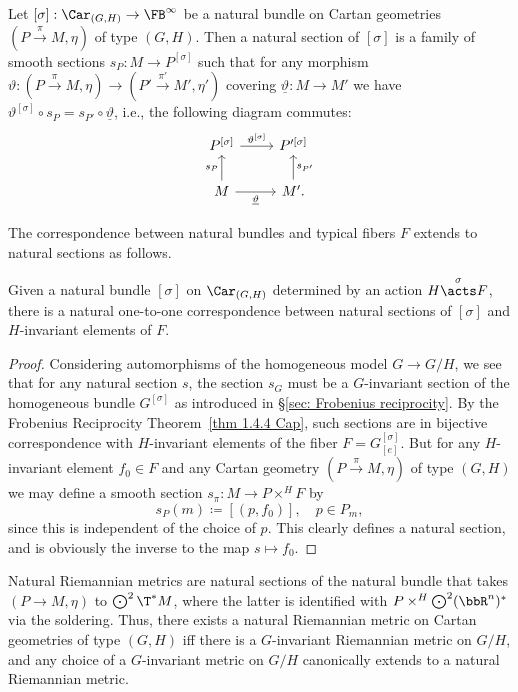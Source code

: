 \begin{defn}
    Let $[\sigma]:\Car_{(G,H)}\to \FB^\infty$ be a natural bundle on Cartan geometries $(P\overset{\pi}{\to}M,\eta)$ of type $(G,H)$. Then a natural section of $[\sigma]$ is a family of smooth sections $s_{P}:M\to P^{[\sigma]}$ such that for any morphism $\vartheta:(P\overset{\pi}{\to} M,\eta)\to (P'\overset{\pi'}{\to} M',\eta')$ covering $\underline{\vartheta}:M\to M'$ we have $\vartheta^{[\sigma]}\circ s_P=s_{P'}\circ \underline{\vartheta}$, i.e., the following diagram commutes:
    \[
    \begin{tikzcd}
        P^{[\sigma]}\arrow[r,"\vartheta^{[\sigma]}"] & P^{\prime[\sigma]}\\
        M\arrow[u,"s_P"]\arrow[r,swap,"\underline{\vartheta}"]& M'.\arrow[u,swap,"s_{P'}"]
    \end{tikzcd}
    \]
\end{defn}

The correspondence between natural bundles and typical fibers $F$ extends to natural sections as follows.

\begin{prop}\label{prop natural sections}
    Given a natural bundle $[\sigma]$ on $\Car_{(G,H)}$ determined by an action $H\overset{\sigma}{\acts}F$, there is a natural one-to-one correspondence between natural sections of $[\sigma]$ and $H$-invariant elements of $F$.
\end{prop}
\begin{proof}
    Considering automorphisms of the homogeneous model $G\to G\slash H$, we see that for any natural section $s$, the section $s_G$ must be a $G$-invariant section of the homogeneous bundle $G^{[\sigma]}$ as introduced in \S\ref{sec: Frobenius reciprocity}. By the Frobenius Reciprocity Theorem~\ref{thm 1.4.4 Cap}, such sections are in bijective correspondence with $H$-invariant elements of the fiber $F=G^{[\sigma]}_{[e]}$.
    But for any $H$-invariant element $f_0\in F$ and any Cartan geometry $(P\overset{\pi}{\to}M,\eta)$ of type $(G,H)$ we may define a smooth section $s_\pi:M\to P\times^H F$ by 
    \[s_P(m)\coloneqq [(p,f_0)],\quad p\in P_m,\]
    since this is independent of the choice of $p$.  This clearly defines a natural section, and is obviously the inverse to the map $s\mapsto f_0$.
\end{proof}

\begin{example}
    Natural Riemannian metrics are natural sections of the natural bundle that takes $(P\to M,\eta)$ to $\bigodot^2 \T^\ast M$, where the latter is identified with $P\times^H \bigodot^2(\bbR^n)^\ast$ via the soldering. Thus, there exists a natural Riemannian metric on Cartan geometries of type $(G,H)$ iff there is a $G$-invariant Riemannian metric on $G\slash H$, and any choice of a $G$-invariant metric on $G\slash H$ canonically extends to a natural Riemannian metric.
\end{example}


